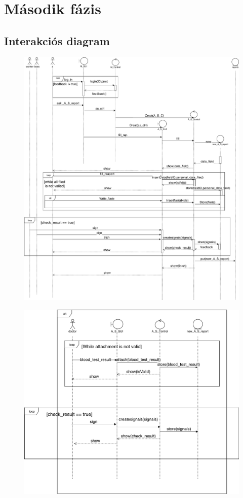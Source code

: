 \chapter{Második fázis}\label{sect:SecondPhase}

\section{Interakciós diagram}

\begin{figure}[!h]
	\centering
	\includegraphics[trim = 0mm 0mm 0mm 0mm,clip,width=140mm, keepaspectratio]{figures/interact1.pdf}
\end{figure}
\begin{figure}[!ht]
\centering
\includegraphics[trim = 0mm 0mm 0mm 0mm,clip,width=140mm, keepaspectratio]{figures/interact2.pdf}
\end{figure}